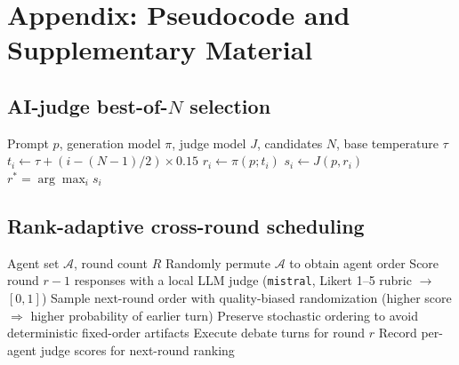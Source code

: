 \documentclass[11pt]{article}
\begin{document}
\appendix

\section{Appendix: Pseudocode and Supplementary Material}
\setcounter{algorithm}{0}
\renewcommand{\thealgorithm}{\Roman{algorithm}}
\setcounter{table}{0}
\renewcommand{\thetable}{\arabic{table}}
\captionsetup[table]{labelformat=empty,justification=raggedright,singlelinecheck=false}

\subsection{AI-judge best-of-$N$ selection}
\begin{algorithm}[H]
\caption{AI-judge best-of-$N$ response selection}
\label{alg:bestofn}
\begin{algorithmic}[1]
\Require Prompt $p$, generation model $\pi$, judge model $J$, candidates $N$, base temperature $\tau$
    \State $t_i \leftarrow \tau + (i - (N-1)/2) \times 0.15$ 
    \State $r_i \leftarrow \pi(p; t_i)$ 
    \State $s_i \leftarrow J(p, r_i)$ 
\EndFor
\State \Return $r^* = \arg\max_i s_i$ 
\end{algorithmic}
\end{algorithm}

\subsection{Rank-adaptive cross-round scheduling}
\begin{algorithm}[H]
\caption{Rank-adaptive cross-round scheduling}
\label{alg:rankadaptive}
\begin{algorithmic}[1]
\Require Agent set $\mathcal{A}$, round count $R$
        \State Randomly permute $\mathcal{A}$ to obtain agent order
    \Else
        \State Score round $r{-}1$ responses with a local LLM judge (\texttt{mistral}, Likert 1--5 rubric $\to$ $[0,1]$)
        \State Sample next-round order with quality-biased randomization (higher score $\Rightarrow$ higher probability of earlier turn)
        \State Preserve stochastic ordering to avoid deterministic fixed-order artifacts
    \EndIf
    \State Execute debate turns for round $r$
    \State Record per-agent judge scores for next-round ranking
\EndFor
\end{algorithmic}
\end{algorithm}
\end{document}
